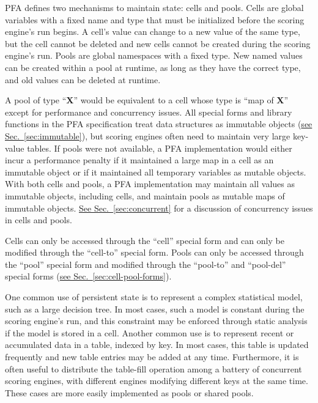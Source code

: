 \documentclass{article}
\newcommand{\PFAtp}{\ttfamily\bfseries}
\theoremstyle{definition}
\begin{document}
PFA defines two mechanisms to maintain state: cells and pools.  Cells are global variables with a fixed name and type that must be initialized before the scoring engine's run begins.  A cell's value can change to a new value of the same type, but the cell cannot be deleted and new cells cannot be created during the scoring engine's run.  Pools are global namespaces with a fixed type.  New named values can be created within a pool at runtime, as long as they have the correct type, and old values can be deleted at runtime.

A pool of type ``{\PFAtp X}'' would be equivalent to a cell whose type is ``map of {\PFAtp X}'' except for performance and concurrency issues.  All special forms and library functions in the PFA specification treat data structures as immutable objects (\hyperlink{hsec:immutable}{see Sec.~\ref{sec:immutable}}), but scoring engines often need to maintain very large key-value tables.  If pools were not available, a PFA implementation would either incur a performance penalty if it maintained a large map in a cell as an immutable object or if it maintained all temporary variables as mutable objects.  With both cells and pools, a PFA implementation may maintain all values as immutable objects, including cells, and maintain pools as mutable maps of immutable objects.  \hyperlink{hsec:concurrent}{See Sec.~\ref{sec:concurrent}} for a discussion of concurrency issues in cells and pools.

Cells can only be accessed through the ``cell'' special form and can only be modified through the ``cell-to'' special form.  Pools can only be accessed through the ``pool'' special form and modified through the ``pool-to'' and ``pool-del'' special forms (\hyperlink{hsec:cell-pool-forms}{see Sec.~\ref{sec:cell-pool-forms}}).

One common use of persistent state is to represent a complex statistical model, such as a large decision tree.  In most cases, such a model is constant during the scoring engine's run, and this constraint may be enforced through static analysis if the model is stored in a cell.  Another common use is to represent recent or accumulated data in a table, indexed by key.  In most cases, this table is updated frequently and new table entries may be added at any time.  Furthermore, it is often useful to distribute the table-fill operation among a battery of concurrent scoring engines, with different engines modifying different keys at the same time.  These cases are more easily implemented as pools or shared pools.
\end{document}

